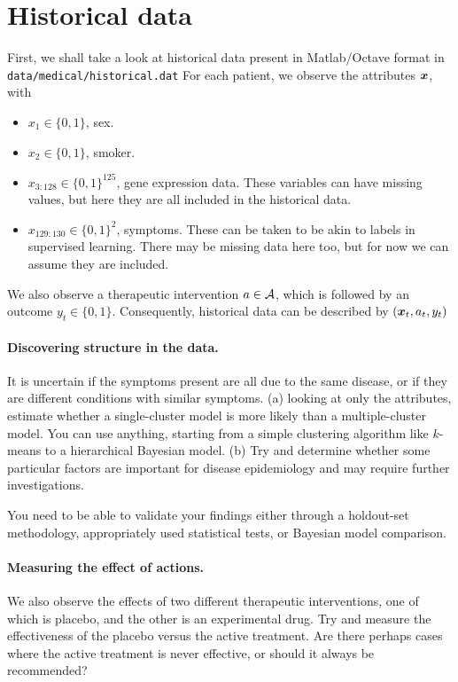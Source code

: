 
\section{Historical data}

First, we shall take a look at historical data present in Matlab/Octave format in
\texttt{data/medical/historical.dat}
For each patient, we observe the attributes $\bx$, with
\begin{itemize}
\item $x_1 \in \{0,1\}$, sex.
\item $x_2 \in \{0,1\}$, smoker.
\item $x_{3:128} \in \{0,1\}^{125}$, gene expression data. These variables can have missing values, but here they are all included in the historical data.
\item $x_{129:130} \in \{0,1\}^2$, symptoms. These can be taken to be akin to labels in supervised learning. There may be missing data here too, but for now we can assume they are included.
\end{itemize}
We also observe a therapeutic intervention $a \in {\mathcal{A}}$, which is followed by an outcome $y_t \in \{0,1\}$. Consequently, historical data can be described by $(\bx_t, a_t, y_t)$

\paragraph{Discovering structure in the data.}
It is uncertain if the symptoms present are all due to the same disease, or if they are different conditions with similar symptoms. (a) looking at only the attributes, estimate whether a single-cluster model is more likely than a multiple-cluster model. You can use anything, starting from a simple clustering algorithm like $k$-means to a hierarchical Bayesian model. (b) Try and determine whether some particular factors are important for disease epidemiology and may require further investigations.

You need to be able to validate your findings either through a holdout-set methodology, appropriately used statistical tests, or Bayesian model comparison.

\paragraph{Measuring the effect of actions.}
We also observe the effects of two different therapeutic interventions, one of which is placebo, and the other is an experimental drug. Try and measure the effectiveness of the placebo versus the active treatment. Are there perhaps cases where the active treatment is never effective, or should it always be recommended?


